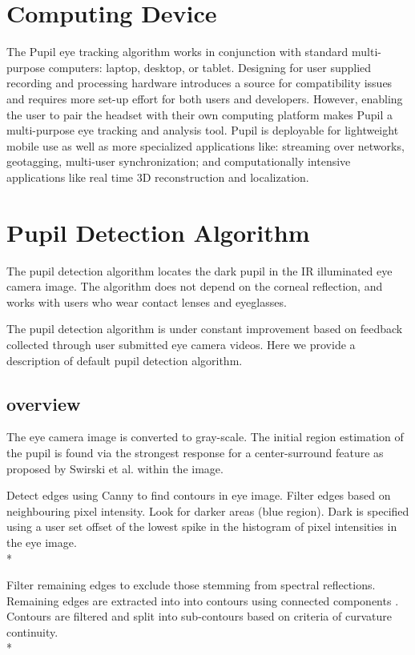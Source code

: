 \documentclass[12pt,fleqn]{book} %
\begin{document}
\section{Computing Device} 
The Pupil eye tracking algorithm works in conjunction with standard multi-purpose computers: laptop, desktop, or tablet. Designing for user supplied recording and processing hardware introduces a source for compatibility issues and requires more set-up effort for both users and developers. However, enabling the user to pair the headset with their own computing platform makes Pupil a multi-purpose eye tracking and analysis tool. Pupil is deployable for lightweight mobile use as well as more specialized applications like: streaming over networks, geotagging, multi-user synchronization; and computationally intensive applications like real time 3D reconstruction and localization.

\section{Pupil Detection Algorithm} 
The pupil detection algorithm locates the dark pupil in the IR illuminated eye camera image. The algorithm does not depend on the corneal reflection, and works with users who wear contact lenses and eyeglasses. \bigskip

The pupil detection algorithm is under constant improvement based on feedback collected through user submitted eye camera videos. Here we provide a description of default pupil detection algorithm.
\bigskip

\subsection{overview} 
The eye camera image is converted to gray-scale. The initial region estimation of the pupil is found via the strongest response for a center-surround feature as proposed by Swirski et al. \cite{swirski} within the image. \newline  

Detect edges using Canny \cite{canny} to find contours in eye image. Filter edges based on neighbouring pixel intensity. Look for darker areas (blue region). Dark is specified using a user set offset of the lowest spike in the histogram of pixel intensities in the eye image. \\*

Filter remaining edges to exclude those stemming from spectral reflections. Remaining edges are extracted into into contours using connected components \cite{suzuki}. Contours are filtered and split into sub-contours based on criteria of curvature continuity. \\*
\end{document}
